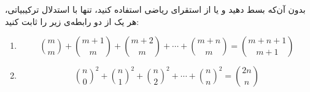 \EXERCISE
بدون آن‌که بسط دهید و یا از استقرای ریاضی استفاده کنید، تنها با استدلال ترکیبیاتی، هر یک از دو رابطه‌ی زیر را ثابت کنید:
\begin{enumerate}
\item
$$\binom{m}{m} + \binom{m+1}{m} + \binom{m+2}{m} + \cdots + \binom{m+n}{m} = \binom{m + n + 1}{m + 1}$$
\item
$${\binom{n}{0}}^2 + {\binom{n}{1}}^2 + {\binom{n}{2}}^2 + \cdots + {\binom n n}^2 = \binom{2n}{n}$$
\end{enumerate}